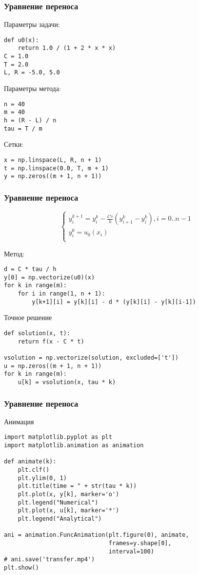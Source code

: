 \documentclass[10pt]{beamer}
\begin{document}
\begin{frame}[fragile]
\frametitle{Уравнение переноса}
Параметры задачи:
\begin{lstlisting}
def u0(x):
    return 1.0 / (1 + 2 * x * x)
C = 1.0
T = 2.0
L, R = -5.0, 5.0
\end{lstlisting}

Параметры метода:
\begin{lstlisting}
n = 40
m = 40
h = (R - L) / n
tau = T / m
\end{lstlisting}

Сетки:
\begin{lstlisting}
x = np.linspace(L, R, n + 1)
t = np.linspace(0.0, T, m + 1)
y = np.zeros((m + 1, n + 1))
\end{lstlisting}
\end{frame}

\begin{frame}[fragile]
\frametitle{Уравнение переноса}
$$
\begin{cases}
y^{k+1}_i = y^k_i - \frac{C \tau}{h} ( y^{k}_{i+1} - y^k_i), i = 0..n-1\\
y_i^0 = u_0(x_i)\\
\end{cases}
$$

Метод:
\begin{lstlisting}
d = C * tau / h
y[0] = np.vectorize(u0)(x)
for k in range(m):
    for i in range(1, n + 1):
        y[k+1][i] = y[k][i] - d * (y[k][i] - y[k][i-1])
\end{lstlisting}

Точное решение
\begin{lstlisting}
def solution(x, t):
    return f(x - C * t)

vsolution = np.vectorize(solution, excluded=['t'])
u = np.zeros((m + 1, n + 1))
for k in range(m):
	u[k] = vsolution(x, tau * k)
\end{lstlisting}
\end{frame}



\begin{frame}[fragile]
\frametitle{Уравнение переноса}
Анимация

\begin{lstlisting}[showstringspaces=false]
import matplotlib.pyplot as plt
import matplotlib.animation as animation

def animate(k):
    plt.clf()
    plt.ylim(0, 1)
    plt.title(time = " + str(tau * k))
    plt.plot(x, y[k], marker='o')
    plt.legend("Numerical")
    plt.plot(x, u[k], marker='*')
    plt.legend("Analytical")

ani = animation.FuncAnimation(plt.figure(0), animate, 
                              frames=y.shape[0],
                              interval=100)
# ani.save('transfer.mp4')
plt.show()
\end{lstlisting}
\end{frame}
\end{document}
